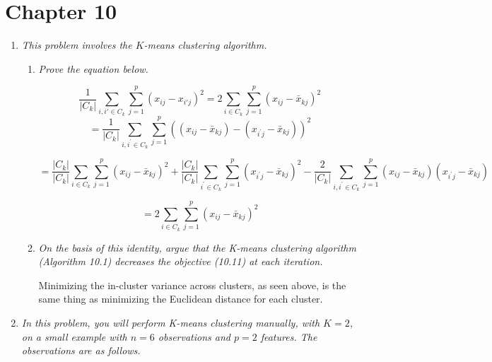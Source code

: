 \documentclass[11pt]{article}\usepackage[]{graphicx}\usepackage[]{color}
\begin{document}
    
    
\bigskip

\section*{Chapter 10}

    \begin{enumerate}
    
    	\item \textit{This problem involves the $K$-means clustering algorithm.}
			\begin{enumerate}
				\item \textit{Prove the equation below.}
				
				$$ \frac{1}{|C_k|} \sum_{i,i' \in C_k} \sum^p_{j=1} (x_{ij} - x_{i'j})^2 
					= 2\sum_{i \in C_k} \sum^p_{j=1} (x_{ij} - \bar{x}_{kj})^2 $$
				$$ = \frac{1}{|C_k|} \sum\limits_{i,i^{\prime} \in C_k} \sum\limits_{j=1}^p ((x_{ij} - \bar{x}_{kj}) - (x_{i^\prime j} - \bar{x}_{kj}))^2 $$
				
				$$ = \frac{|C_k|}{|C_k|} \sum\limits_{i \in C_k} \sum\limits_{j=1}^p (x_{ij} - \bar{x}_{kj})^2 +
  \frac{|C_k|}{|C_k|} \sum\limits_{i^{\prime} \in C_k} \sum\limits_{j=1}^p (x_{i^\prime j} - \bar{x}_{kj})^2 -
  \frac{2}{|C_k|} \sum\limits_{i,i^{\prime} \in C_k} \sum\limits_{j=1}^p (x_{ij} - \bar{x}_{kj})(x_{i^\prime j} - \bar{x}_{kj}) $$
  
        $$ = 2 \sum\limits_{i \in C_k} \sum\limits_{j=1}^p (x_{ij} - \bar{x}_{kj})^2 $$
				
				\item \textit{On the basis of this identity, argue that the K-means clustering algorithm (Algorithm 10.1) decreases the objective (10.11) at each iteration.}
				
				Minimizing the in-cluster variance across clusters, as seen above, is the same thing as minimizing the Euclidean distance for each cluster.
				
			\end{enumerate}
	    
        \setcounter{enumi}{2}
		
		\item \textit{In this problem, you will perform K-means clustering manually, with $K = 2$, on a small example with $n = 6$ observations and $p = 2$ features. The observations are as follows.}
		

\end{enumerate}
\end{document}
